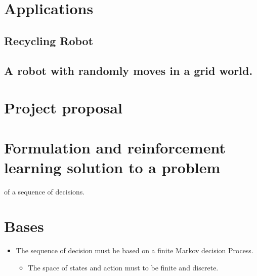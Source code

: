 \documentclass[
  letterpaper,
]{krantz}
\providecommand{\tightlist}{%
  \setlength{\itemsep}{0pt}\setlength{\parskip}{0pt}}\usepackage{longtable,booktabs,array}
\theoremstyle{plain}
\theoremstyle{definition}
\theoremstyle{definition}
\theoremstyle{remark}
\begin{document}

\chapter{Applications}\label{applications}

\section{Recycling Robot}\label{recycling-robot}

\section{A robot with randomly moves in a grid
world.}\label{a-robot-with-randomly-moves-in-a-grid-world.}


\chapter{Project proposal}\label{project-proposal}


\chapter{Formulation and reinforcement learning solution to a
problem}\label{formulation-and-reinforcement-learning-solution-to-a-problem}

of a sequence of decisions.


\chapter{Bases}\label{bases}

\begin{itemize}
\tightlist
\item
  The sequence of decision must be based on a finite Markov decision
  Process.

  \begin{itemize}
  \tightlist
  \item
    The space of states and action must to be finite and discrete.
  \end{itemize}
\end{itemize}

\section{}\label{section}
\end{document}
